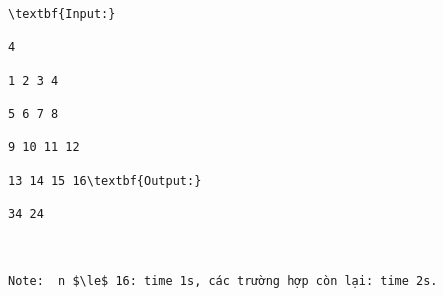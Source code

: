 \begin{verbatim}
\textbf{Input:}

4

1 2 3 4

5 6 7 8

9 10 11 12

13 14 15 16\textbf{Output:}

34 24

 

Note:  n $\le$ 16: time 1s, các trường hợp còn lại: time 2s.\end{verbatim}
